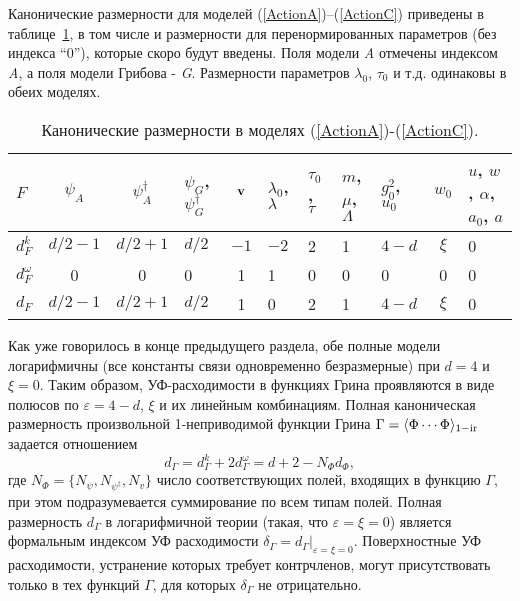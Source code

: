 \documentclass[a4paper,10pt]{article}
\begin{document}
Канонические размерности для моделей (\ref{ActionA})--(\ref{ActionC})
приведены в таблице~\ref{table1}, в том числе и размерности для перенормированных параметров (без индекса ``0''), которые скоро будут введены.
Поля модели {\it A} отмечены индексом {\it A},
а поля  модели Грибова - {\it G}. Размерности параметров $\lambda_{0}$, $\tau_{0}$ и т.д. одинаковы в обеих моделях. 
\begin{table}[H]
\caption{Канонические размерности в моделях (\protect\ref{ActionA})-(\protect\ref{ActionC}).}
\label{table1}
\begin{tabular}{|p{0.3cm}|c|c|p{0.5cm}|c|p{0.5cm}|p{0.5cm}|p{0.5cm}|p{0.7cm}|c|p{1cm}|}
\hline
$F$ & $\psi_{A}$ & $\psi_{A}^{\dag}$ & $\psi_{G}$, $\psi_{G}^{\dag}$ &
$ {\bf v} $ &   $\lambda_{0}$, $\lambda$ &
$\tau_{0}$, $\tau$ &  $m$, $\mu$,$\Lambda$ & $g_{0}^{2}$, $u_{0}$ &
$w_{0}$ & $u$, $w$, $\alpha$, $a_{0}$, $a$ \\
\hline
$d_{F}^{k}$ & $d/2-1$ & $d/2+1$ & $d/2$ & $-1$ & $-2$  & 2
& 1 &  $4-d$ & $\xi$ & 0 \\
\hline
$d_{F}^{\omega }$ & 0 & 0& 0 & 1 & 1 & 0 & 0 &  0 & 0 & 0 \\
\hline
$d_{F}$ & $d/2-1$ & $d/2+1$ &
$d/2$ & 1 & 0 & 2 & 1 &  $4-d$  & $\xi$ & 0 \\
\hline
\end{tabular}
\end{table}
Как уже говорилось в конце предыдущего раздела, обе полные модели логарифмичны (все константы связи одновременно безразмерные) при  $d=4$ и $\xi=0$.
Таким образом, УФ-расходимости в функциях Грина проявляются в виде полюсов по $\varepsilon = 4-d$, $\xi$  и их линейным комбинациям.
Полная каноническая размерность произвольной 1-неприводимой функции Грина $\Gamma = \langle\Phi \cdots \Phi \rangle _{\rm 1-ir}$
задается отношением  \cite{Book3} 
\begin{equation}
d_{\Gamma }=d_{\Gamma }^k+2d_{\Gamma }^{\omega }= d+2-N_{\Phi }d_{\Phi},
\label{dGamma}
\end{equation}
 где
 $N_{\Phi}=\{N_{\psi},N_{\psi^{\dag}}, N_{v}\}$  число соответствующих полей, входящих в функцию  $\Gamma$, 
при этом подразумевается суммирование по всем типам полей. Полная размерность $d_{\Gamma}$
в логарифмичной теории (такая, что $\varepsilon=\xi=0$) является формальным индексом УФ расходимости
 $\delta_{\Gamma}=d_{\Gamma}|_{\varepsilon=\xi=0}$. Поверхностные УФ расходимости, устранение которых требует контрчленов, могут присутствовать
 только в тех функций  $\Gamma$, для которых $\delta_{\Gamma}$ не отрицательно.
\end{document}

